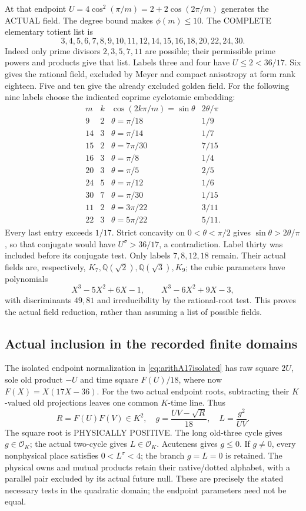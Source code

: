 \documentclass[11pt]{article}
\begin{document}
At that endpoint \(U=4\cos^2(\pi/m)=2+2\cos(2\pi/m)\)
generates the ACTUAL field.
The degree bound makes \(\phi(m)\le10\).
The COMPLETE elementary totient list is
\[
 3,4,5,6,7,8,9,10,11,12,14,15,16,18,20,22,24,30 .
\]
Indeed only prime divisors \(2,3,5,7,11\) are possible;
their permissible prime powers and products give that list.
Labels three and four have \(U\le2<36/17\).
Six gives the rational field, excluded by Meyer and compact
anisotropy at form rank eighteen.
Five and ten give the already excluded golden field.
For the following nine labels choose the indicated coprime
cyclotomic embedding:
\[
\begin{array}{c|c|c|c}
m&k&\cos(2k\pi/m)=\sin\theta&2\theta/\pi\\ \hline
9&2&\theta=\pi/18&1/9\\
14&3&\theta=\pi/14&1/7\\
15&2&\theta=7\pi/30&7/15\\
16&3&\theta=\pi/8&1/4\\
20&3&\theta=\pi/5&2/5\\
24&5&\theta=\pi/12&1/6\\
30&7&\theta=\pi/30&1/15\\
11&2&\theta=3\pi/22&3/11\\
22&3&\theta=5\pi/22&5/11 .
\end{array}
\]
Every last entry exceeds \(1/17\).
Strict concavity on \(0<\theta<\pi/2\) gives
\(\sin\theta>2\theta/\pi\), so that conjugate would have
\(U^\sigma>36/17\), a contradiction.
Label thirty was included before its conjugate test.
Only labels \(7,8,12,18\) remain.
Their actual fields are, respectively,
\(K_7,\mathbb Q(\sqrt2),\mathbb Q(\sqrt3),K_9\);
the cubic parameters have polynomials
\[
 X^3-5X^2+6X-1,\qquad X^3-6X^2+9X-3,
\]
with discriminants \(49,81\) and irreducibility by the
rational-root test.  This proves the actual field reduction,
rather than assuming a list of possible fields.

\subsection{Actual inclusion in the recorded finite domains}
\label{app:arithA17datainclusion}

The isolated endpoint normalization in
\eqref{eq:arithA17isolated} has raw square \(2U\), sole old
product \(-U\) and time square \(F(U)/18\), where now
\(F(X)=X(17X-36)\).
For the two actual endpoint roots, subtracting their \(K\)-valued
old projections leaves one common \(K\)-time line.
Thus
\[
 R=F(U)F(V)\in K^2,\quad
 g={\frac{UV-\sqrt R}{18}},\quad
 L={\frac{g^2}{UV}}.
\]
The square root is PHYSICALLY POSITIVE.
The long old-three cycle gives \(g\in\mathcal O_K\);
the actual two-cycle gives \(L\in\mathcal O_K\).
Acuteness gives \(g\le0\).
If \(g\ne0\), every nonphysical place satisfies \(0<L^\sigma<4\);
the branch \(g=L=0\) is retained.
The physical owns and mutual products retain their native/dotted
alphabet, with a parallel pair excluded by its actual future null.
These are precisely the stated necessary tests in the quadratic
domain; the endpoint parameters need not be equal.
\end{document}
